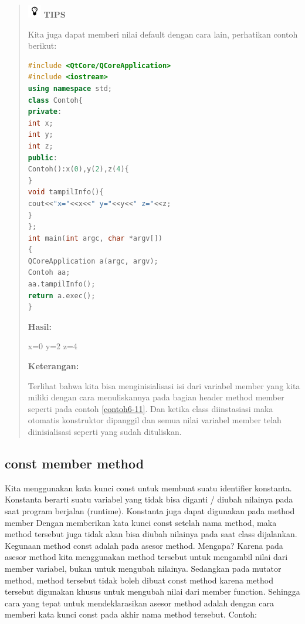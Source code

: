 \begin{quotation}
\includegraphics{../manuscript/images/tips}	\textbf{TIPS} 
	
	Kita juga
	dapat memberi nilai default dengan cara lain, perhatikan contoh berikut:
	
\begin{lstlisting}[language=c++, caption=Memberi nilai default pada constructor, label=contoh6-11]
#include <QtCore/QCoreApplication>
#include <iostream>
using namespace std;
class Contoh{
private:
int x;
int y;
int z;
public:
Contoh():x(0),y(2),z(4){
}
void tampilInfo(){
cout<<"x="<<x<<" y="<<y<<" z="<<z;
}
};
int main(int argc, char *argv[])
{
QCoreApplication a(argc, argv);
Contoh aa;
aa.tampilInfo();
return a.exec();
}
\end{lstlisting}
	
	\textbf{Hasil:}
	
\begin{lcverbatim}
x=0 y=2 z=4
\end{lcverbatim}
	
	\textbf{Keterangan:}
	
	Terlihat bahwa kita bisa menginisialisasi isi dari variabel member yang
	kita miliki dengan cara menuliskannya pada bagian header method member
	seperti pada contoh \ref{contoh6-11}. Dan ketika class diinstasiasi maka otomatis
	konstruktor dipanggil dan semua nilai variabel member telah
	diinisialisasi seperti yang sudah dituliskan.
\end{quotation}


\subsection{const member method}\label{const-member-method}

Kita menggunakan kata kunci const untuk membuat suatu identifier
konstanta. Konstanta berarti suatu variabel yang tidak bisa diganti /
diubah nilainya pada saat program berjalan (runtime). Konstanta juga
dapat digunakan pada method member Dengan memberikan kata kunci const
setelah nama method, maka method tersebut juga tidak akan bisa diubah
nilainya pada saat class dijalankan. Kegunaan method const adalah pada
asesor method. Mengapa? Karena pada asesor method kita menggunakan
method tersebut untuk mengambil nilai dari member variabel, bukan untuk
mengubah nilainya. Sedangkan pada mutator method, method tersebut tidak
boleh dibuat const method karena method tersebut digunakan khusus untuk
mengubah nilai dari member function. Sehingga cara yang tepat untuk
mendeklarasikan asesor method adalah dengan cara memberi kata kunci
const pada akhir nama method tersebut. Contoh:

